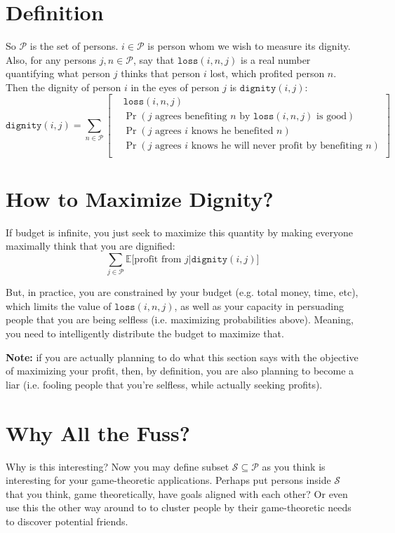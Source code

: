 \documentclass{report}
\begin{document}
\section{Definition}
So $\mathcal{P}$ is the set of persons. $i \in \mathcal{P}$ is person whom we
wish to measure its dignity.  Also, for any persons $j,n \in \mathcal{P}$, say
that $\texttt{loss}(i,n,j)$ is a real number quantifying what person $j$ thinks
that person $i$ lost,
which profited person $n$. Then the dignity of person $i$ in the eyes of person
$j$ is $\texttt{dignity}(i,j)$:
\[
\texttt{dignity}(i,j) = 
\sum_{n \in \mathcal{P}}
\left[
\begin{split}
&\texttt{loss}(i,n,j)\\
&\Pr(\text{$j$ agrees benefiting $n$ by $\texttt{loss}(i,n,j)$ is good})\\
&\Pr(\text{$j$ agrees $i$ knows he benefited $n$})\\
&\Pr(\text{$j$ agrees $i$ knows he will never profit by benefiting $n$})\\
\end{split}
\right]
\]


\section{How to Maximize Dignity?}
If budget is infinite, you just seek to maximize this quantity by making
everyone maximally think that you are dignified:
\[
\sum_{j \in \mathcal{P}}
\mathbb{E}\big[
    \text{profit from $j$} 
    \big|
    \texttt{dignity}(i,j)
\big]
\]

But, in practice, you are constrained by your budget (e.g. total money,
time, etc), which limits the value of $\texttt{loss}(i,n,j)$, as well as your
capacity in persuading people that you are being selfless (i.e. maximizing
probabilities above). Meaning, you need to intelligently distribute the budget
to maximize that. 

\textbf{Note:} if you are actually planning to do what this section says with
the objective of maximizing your profit, then, by definition, you are also
planning to become a liar (i.e. fooling people that you're selfless, while
actually seeking profits).

\section{Why All the Fuss?}
Why is this interesting? Now you may define subset $\mathcal{S} \subseteq
\mathcal{P}$ as you think
is interesting for your game-theoretic applications. Perhaps put persons inside
$\mathcal{S}$ that you think, game theoretically, have goals aligned with each
other? Or even use this the other way around to to cluster people by their
game-theoretic needs to discover potential friends.
\end{document}
